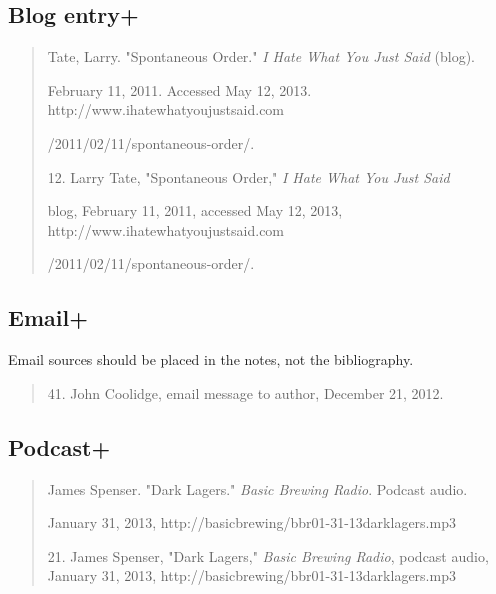 \subsection{Blog entry+}
\begin{quote}

Tate, Larry. "Spontaneous Order." \emph{I Hate What You Just Said} (blog). 

\hspace{.4in}February 11, 2011. Accessed May 12, 2013. http://www.ihatewhatyoujustsaid.com

\hspace{.4in}/2011/02/11/spontaneous-order/.

\medskip

\hspace{.4in}12. Larry Tate, "Spontaneous Order," \emph{I Hate What You Just Said}

 blog, February 11, 2011, accessed May 12, 2013, http://www.ihatewhatyoujustsaid.com

/2011/02/11/spontaneous-order/.

\end{quote}


\subsection{Email+}
Email sources should be placed in the notes, not the bibliography.

\begin{quote}

\hspace{.4in}41. John Coolidge, email message to author, December 21, 2012. 
\end{quote}


\subsection{Podcast+}

\begin{quote}

James Spenser. "Dark Lagers." \emph{Basic Brewing Radio}. Podcast audio. 

\hspace{.4in}January 31, 2013, http://basicbrewing/bbr01-31-13darklagers.mp3

\medskip

\hspace{.4in}21. James Spenser, "Dark Lagers," \emph{Basic Brewing Radio}, podcast audio, January 31, 2013, http://basicbrewing/bbr01-31-13darklagers.mp3

\end{quote}

